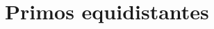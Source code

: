 \documentclass[a4paper,12pt,twoside]{book}
\begin{document}
\chapter{Primos equidistantes}

% 
% 
% 
% 
% 
% 
% 
% 
% 
% 
\end{document}
